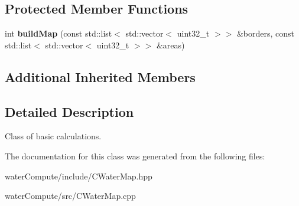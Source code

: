 \subsection*{Protected Member Functions}
\begin{DoxyCompactItemize}
\item 
\mbox{\label{class_c_water_map_a3dcda9c5dd50d45f317e526c6949f8db}} 
int {\bfseries build\+Map} (const std\+::list$<$ std\+::vector$<$ uint32\+\_\+t $>$$>$ \&borders, const std\+::list$<$ std\+::vector$<$ uint32\+\_\+t $>$$>$ \&areas)
\end{DoxyCompactItemize}
\subsection*{Additional Inherited Members}


\subsection{Detailed Description}
Class of basic calculations. 

The documentation for this class was generated from the following files\+:\begin{DoxyCompactItemize}
\item 
water\+Compute/include/C\+Water\+Map.\+hpp\item 
water\+Compute/src/C\+Water\+Map.\+cpp\end{DoxyCompactItemize}
